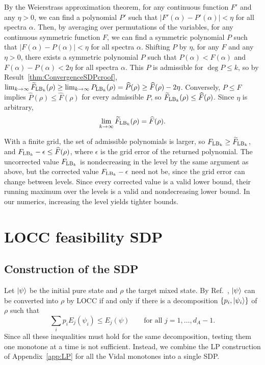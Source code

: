 \documentclass[aps,pra,twocolumn,superscriptaddress]{revtex4-2}
\renewcommand{\a}{\alpha}
\begin{document}
\begin{widetext}
By the Weierstrass approximation theorem, for any continuous function $F'$ and any $\eta>0$, we can find a polynomial $P'$ such that $|F'(\a)-P'(\a)| < \eta$ for all spectra $\a$. Then, by averaging over permutations of the variables, for any continuous symmetric function $F$, we can find a symmetric polynomial $P$ such that $|F(\a)-P(\a)| < \eta$ for all spectra $\a$.
Shifting $P$ by $\eta$, for any $F$ and any $\eta>0$, there exists a symmetric polynomial $P$ such that $P(\a) < F(\a)$ and $F(\a)-P(\a) < 2\eta$ for all spectra $\a$. This $P$ is admissible for $\deg P \leq k$, so by Result~\ref{thm:ConvergenceSDPcroof}, $\lim_{k\to\infty}\widetilde F_{{\rm LB}_k}(\rho)\geq\lim_{k\to\infty}P_{{\rm LB}_k}(\rho)=\widehat P(\rho)\geq\widehat F(\rho)-2\eta$. Conversely, $P\leq F$ implies $\widehat P(\rho)\leq\widehat F(\rho)$ for every admissible $P$, so $\widetilde F_{{\rm LB}_k}(\rho)\leq\widehat F(\rho)$. Since $\eta$ is arbitrary,
\begin{equation}
    \lim_{k\to\infty}\widetilde F_{{\rm LB}_k}(\rho)=\widehat F(\rho).
\end{equation}

With a finite grid, the set of admissible polynomials is larger, so $F_{{\rm LB}_k}\geq\widetilde F_{{\rm LB}_k}$, and $F_{{\rm LB}_k}-\epsilon\leq\widehat F(\rho)$, where $\epsilon$ is the grid error of the returned polynomial. The uncorrected value $F_{{\rm LB}_k}$ is nondecreasing in the level by the same argument as above, but the corrected value $F_{{\rm LB}_k}-\epsilon$ need not be, since the grid error can change between levels. Since every corrected value is a valid lower bound, their running maximum over the levels is a valid and nondecreasing lower bound. In our numerics, increasing the level yields tighter bounds.

\section{LOCC feasibility SDP}\label{app:LOCC}
\subsection{Construction of the SDP}
Let $\ket{\psi}$ be the initial pure state and $\rho$ the target mixed state. By Ref.~\cite{Jonathan_1999}, $\ket{\psi}$ can be converted into $\rho$ by LOCC if and only if there is a decomposition $\{p_i,\ket{\psi_i}\}$ of $\rho$ such that
\begin{equation}\label{eq:LOCCcriterion}
    \sum_i p_i E_j(\psi_i)\leq E_j(\psi)\qquad\text{for all } j=1,\dots,d_A-1 .
\end{equation}
Since all these inequalities must hold for the same decomposition, testing them one monotone at a time is not sufficient. Instead, we combine the LP construction of Appendix~\ref{app:LP} for all the Vidal monotones into a single SDP.


\end{widetext}
\end{document}
